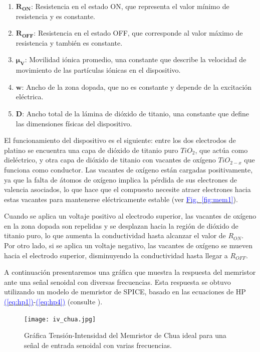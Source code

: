 \documentclass[12pt,a4paper]{report} %
\newcommand{\fref}[1]{\hyperref[#1]{\textcolor{blue}{Fig.~\ref*{#1}}}}
\newcommand{\eref}[1]{\hyperref[#1]{\textcolor{blue}{(\ref*{#1})}}}
\begin{document}
	\begin{enumerate}
		\item $\bm{R_{ON}}$: Resistencia en el estado ON, que representa el valor mínimo de resistencia y es constante.
		\item $\bm{R_{OFF}}$: Resistencia en el estado OFF, que corresponde al valor máximo de resistencia y también es constante.
		\item $\bm{\mu_V}$: Movilidad iónica promedio, una constante que describe la velocidad de movimiento de las partículas iónicas en el dispositivo.
		\item $\bm{w}$: Ancho de la zona dopada, que no es constante y depende de la excitación eléctrica.
		\item $\bm{D}$: Ancho total de la lámina de dióxido de titanio, una constante que define las dimensiones físicas del dispositivo.
	\end{enumerate}\smallskip
	
	El funcionamiento del dispositivo es el siguiente: entre los dos electrodos de platino se encuentra una capa de dióxido de titanio puro $TiO_2$, que actúa como dieléctrico, y otra capa de dióxido de titanio con vacantes de oxígeno $TiO_{2-x}$ que funciona como conductor. Las vacantes de oxígeno están cargadas positivamente, ya que la falta de átomos de oxígeno implica la pérdida de sus electrones de valencia asociados, lo que hace que el compuesto necesite atraer electrones hacia estas vacantes para mantenerse eléctricamente estable (ver \fref{fig:mem1}).
	
	\vspace{0.5cm} Cuando se aplica un voltaje positivo al electrodo superior, las vacantes de oxígeno en la zona dopada son repelidas y se desplazan hacia la región de dióxido de titanio puro, lo que aumenta la conductividad hasta alcanzar el valor de $R_{ON}$. Por otro lado, si se aplica un voltaje negativo, las vacantes de oxígeno se mueven hacia el electrodo superior, disminuyendo la conductividad hasta llegar a $R_{OFF}$.

	 \vspace{0.5cm}A continuación presentaremos una gráfica que muestra la respuesta del memristor ante una señal senoidal con diversas frecuencias. Esta respuesta se obtuvo utilizando un modelo de memristor de SPICE, basado en las ecuaciones de HP \eref{eq:hp1}-\eref{eq:hp4} (consulte \cite{biolek}).
	
	\newpage 
	
		\vspace{0.5cm}\begin{figure}[h]
		\centering
		\texttt{[image: iv\_chua.jpg]}
		\caption{Gráfica Tensión-Intensidad del Memristor de Chua ideal para una señal de entrada senoidal con varias frecuencias.}
		\label{fig:iv_chua}
	\end{figure}\smallskip
		
\end{document}

